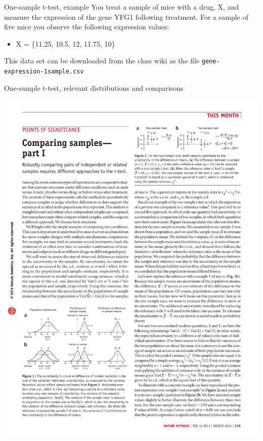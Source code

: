 \documentclass[presentation]{beamer}
\begin{document}
\begin{frame}[fragile,label={sec:orge873c04}]{One-sample t-test, example}
 You treat a sample of mice with a drug, X, and measure the expression of the gene YFG1 following treatment. For a sample of five mice you observe the following expression values:

\begin{itemize}
\item X = \{11.25, 10.5, 12, 11.75, 10\}
\end{itemize}

This data set can be downloaded from the class wiki as the file \texttt{gene-expression-1sample.csv}
\end{frame}

\begin{frame}[label={sec:org26ca729}]{One-sample t-test, relevant distributions and comparisons}
\begin{center}
\includegraphics[height=0.33\textheight]{fig-onesample-distns.pdf}
\end{center}



\end{frame}
\end{document}
